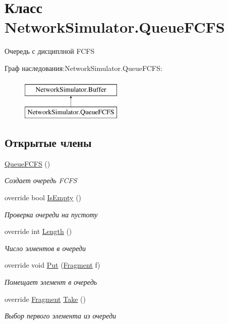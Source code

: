 \hypertarget{class_network_simulator_1_1_queue_f_c_f_s}{}\section{Класс Network\+Simulator.\+Queue\+F\+C\+FS}
\label{class_network_simulator_1_1_queue_f_c_f_s}


Очередь с дисциплной F\+C\+FS  


Граф наследования\+:Network\+Simulator.\+Queue\+F\+C\+FS\+:\begin{figure}[H]
\begin{center}
\leavevmode
\includegraphics[height=2.000000cm]{class_network_simulator_1_1_queue_f_c_f_s}
\end{center}
\end{figure}
\subsection*{Открытые члены}
\begin{DoxyCompactItemize}
\item 
\hyperlink{class_network_simulator_1_1_queue_f_c_f_s_a812ab2164add073d81904f6c9e458037}{Queue\+F\+C\+FS} ()
\begin{DoxyCompactList}\small\item\em Создает очередь F\+C\+FS \end{DoxyCompactList}\item 
override bool \hyperlink{class_network_simulator_1_1_queue_f_c_f_s_abf626c68dc10a0fe86e7865d0717b012}{Is\+Empty} ()
\begin{DoxyCompactList}\small\item\em Проверка очереди на пустоту \end{DoxyCompactList}\item 
override int \hyperlink{class_network_simulator_1_1_queue_f_c_f_s_a463716e2e6eebb40170e5e2d82363d73}{Length} ()
\begin{DoxyCompactList}\small\item\em Число элментов в очереди \end{DoxyCompactList}\item 
override void \hyperlink{class_network_simulator_1_1_queue_f_c_f_s_acf69de265821290747952858f417ae5f}{Put} (\hyperlink{class_network_simulator_1_1_fragment}{Fragment} f)
\begin{DoxyCompactList}\small\item\em Помещает элемент в очередь \end{DoxyCompactList}\item 
override \hyperlink{class_network_simulator_1_1_fragment}{Fragment} \hyperlink{class_network_simulator_1_1_queue_f_c_f_s_aa3b80a41b3c15339131d7de216b02a2b}{Take} ()
\begin{DoxyCompactList}\small\item\em Выбор первого элемента из очереди \end{DoxyCompactList}\end{DoxyCompactItemize}
